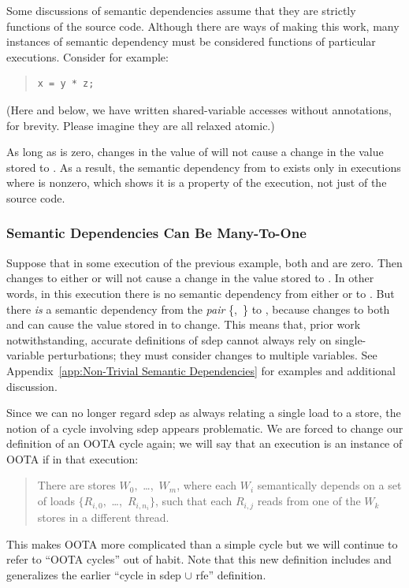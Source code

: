\documentclass[10]{article}
\begin{document}
Some discussions of semantic dependencies assume that they
are strictly functions of the source code.
Although there are ways of making this work, many instances of
semantic dependency must be considered functions of particular executions.
Consider for example:
\begin{quote}
\begin{verbatim}
x = y * z;
\end{verbatim}
\end{quote}
(Here and below, we have written shared-variable accesses without
annotations, for brevity.  Please imagine they are all relaxed atomic.)

As long as  is zero, changes in the
value of  will not cause a change in the value stored to .
As a result, the semantic dependency from  to  exists only
in executions where  is nonzero,
which shows it is a property of the execution, not just of the source code.

\subsubsection{Semantic Dependencies Can Be Many-To-One}
\label{sec:Semantic Dependencies Can Be Many-To-One}

Suppose that in some execution of the previous example,
both  and  are zero.
Then changes to either  or 
will not cause a change in the value stored to .
In other words, in this execution there is no semantic dependency
from either  or  to .
But there \emph{is} a semantic dependency from the \emph{pair}
\{,~\} to ,
because changes to both  and 
can cause the value stored in  to change.
This means that, prior work~\cite{PaulEMcKenney2016OOTA}
notwithstanding, accurate definitions of sdep cannot always rely on
single-variable perturbations;
they must consider changes to multiple variables.
See Appendix~\ref{app:Non-Trivial Semantic Dependencies}
for examples and additional discussion.

Since we can no longer regard sdep as always relating a single load to a store,
the notion of a cycle involving sdep appears problematic.
We are forced to change our definition of an OOTA cycle again;
we will say that an execution is an instance of OOTA if in that execution:
\begin{quote}
	There are stores $W_0,$ \ldots,~$W_m$,
	where each $W_i$ semantically depends on a set of loads
	$\{R_{i,0},$ \ldots,~$R_{i,n_i}\}$,
	such that each $R_{i,j}$ reads from one of the $W_k$
	stores in a different thread.
\end{quote}
This makes OOTA more complicated than a simple cycle but
we will continue to refer to ``OOTA cycles'' out of habit.
Note that this new definition includes and generalizes the earlier
``cycle in sdep $\cup$ rfe'' definition.
\end{document}
